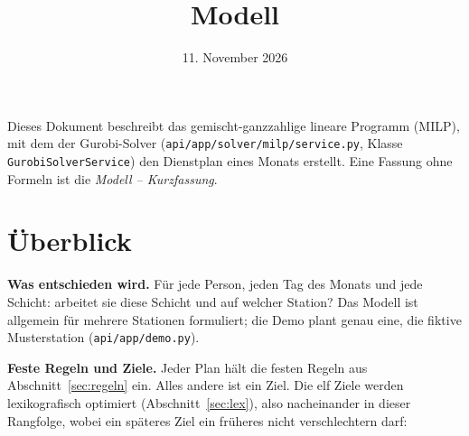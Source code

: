 \documentclass[11pt]{combiArticle}
\newcommand{\code}[1]{\texttt{#1}}
\begin{document}
\title{Modell}
\date{11. November 2026}
\maketitle

Dieses Dokument beschreibt das gemischt-ganzzahlige lineare Programm (MILP), mit dem der Gurobi-Solver
(\code{api/app/solver/milp/service.py}, Klasse \code{GurobiSolverService}) den Dienstplan eines Monats
erstellt. Eine Fassung ohne Formeln ist die \emph{Modell -- Kurzfassung}.

\section{Überblick}

\textbf{Was entschieden wird.} Für jede Person, jeden Tag des Monats und jede Schicht: arbeitet sie diese Schicht
und auf welcher Station? Das Modell ist allgemein für mehrere Stationen formuliert; die Demo plant genau eine,
die fiktive Musterstation (\code{api/app/demo.py}).

\textbf{Feste Regeln und Ziele.} Jeder Plan hält die festen Regeln aus Abschnitt~\ref{sec:regeln} ein. Alles
andere ist ein Ziel. Die elf Ziele werden lexikografisch optimiert (Abschnitt~\ref{sec:lex}), also nacheinander
in dieser Rangfolge, wobei ein späteres Ziel ein früheres nicht verschlechtern darf:
\end{document}
